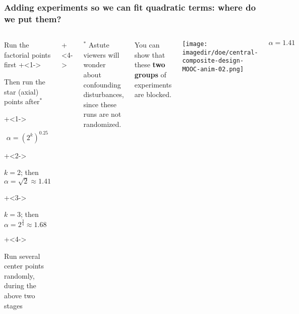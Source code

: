 \begin{frame}\frametitle{Adding experiments so we can fit quadratic terms: where do we put them?}
	\begin{columns}[T]
		
			\vspace{1cm}
			
			\begin{itemize}
				\item	Run the factorial points first
				\onslide+<1->{
					\item	Then run the star (axial) points after$^\ast$
				}
				\onslide+<1->{
					\Large
					\[\alpha  = \left(2^k\right)^{0.25}\]
					
			
					\begin{itemize}
						\onslide+<2->{\item	$k = 2$; then $\alpha = \sqrt{2} \approx 1.41$ }
						\onslide+<3->{\item	$k = 3$; then $\alpha = 2^{\tfrac{3}{4}} \approx 1.68$}
					\end{itemize}
					\normalsize
				}
				\onslide+<4->{
					\item	Run several center points randomly, during the above two stages
				}
			\end{itemize}
			
			\onslide+<4->{
				\vspace{0cm}
				\tiny
				$^\ast$ Astute viewers will wonder about confounding disturbances, since these runs are not randomized.
			
				You can show that these {\color[rgb]{0,0.5,1}\textbf{two}} {\color[rgb]{0.5,0, 0.5}\textbf{groups}} of experiments are blocked.
			}
			
			
			\centerline{\texttt{[image: \\imagedir/doe/central-composite-design-MOOC-anim-02.png]}}
			
			\vspace{-0.5cm}
			\[\alpha = 1.41\]
	\end{columns}
\end{frame}


